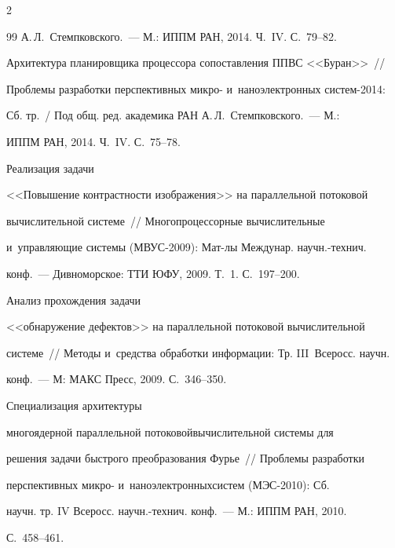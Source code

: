 \begin{multicols}{2}
{{\begin{thebibliography}{99}
А.\,Л.~Стемпковского.~--- М.: ИППМ РАН, 2014. Ч.~IV. С.~79--82.



Архитектура планировщика процессора сопоставления ППВС <<Буран>>~// 

Проблемы разработки перспективных микро- и~наноэлектронных сис\-тем-2014: 

Сб. тр.~/ Под общ. ред. академика РАН А.\,Л.~Стемпковского.~--- М.: 

ИППМ РАН, 2014. Ч.~IV. С.~75--78.


   Реализация задачи 

<<Повышение контрастности изображения>> на параллельной потоковой 

вычислительной системе~// Многопроцессорные вычислительные 

и~управ\-ля\-ющие системы (МВУС-2009): Мат-лы Междунар. научн.-технич. 

конф.~--- Дивноморское: ТТИ ЮФУ, 2009. Т.~1. С.~197--200.


   Анализ прохождения задачи 

<<обнаружение дефектов>> на параллельной потоковой вычислительной 

системе~// Методы и~средства обработки информации: Тр. III~Всеросс. научн. 

конф.~--- М: МАКС Пресс, 2009. С.~346--350.




   Специализация архитектуры 

многоядерной параллельной потоковой\linebreak вы\-чис\-ли\-тель\-ной сис\-те\-мы для 

решения задачи быст\-ро\-го преобразования Фурье~// Проб\-ле\-мы разработки 

перспективных микро- и~наноэлектронных\linebreak сис\-тем (МЭС-2010): Сб. 

научн. тр. IV Всеросс. научн.-технич. конф.~--- М.: ИППМ РАН, 2010.  

С.~458--461.




\end{thebibliography}}}
\end{multicols}
